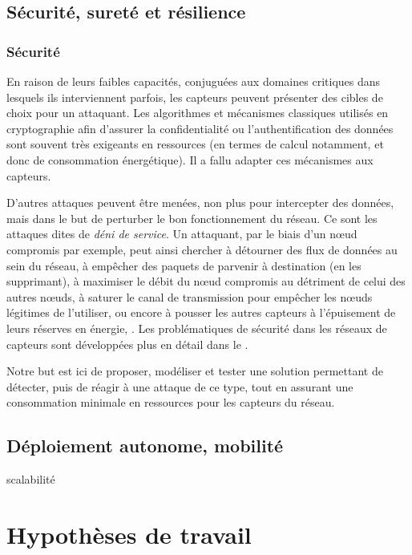     \subsection{Sécurité, sureté et résilience}


        \subsubsection{Sécurité}
En raison de leurs faibles capacités, conjuguées aux domaines critiques dans lesquels ils interviennent parfois, les capteurs peuvent présenter des cibles de choix pour un attaquant.
Les algorithmes et mécanismes classiques utilisés en cryptographie afin d'assurer la confidentialité ou l'authentification des données sont souvent très exigeants en ressources (en termes de calcul notamment, et donc de consommation énergétique).
Il a fallu adapter ces mécanismes aux capteurs.

D'autres attaques peuvent être menées, non plus pour intercepter des données, mais dans le but de perturber le bon fonctionnement du réseau.
Ce sont les attaques dites de \textit{déni de service}.
Un attaquant, par le biais d'un nœud compromis par exemple, peut ainsi chercher à détourner des flux de données au sein du réseau, à empêcher des paquets de parvenir à destination (en les supprimant), à maximiser le débit du nœud compromis au détriment de celui des autres nœuds, à saturer le canal de transmission pour empêcher les nœuds légitimes de l'utiliser, ou encore à pousser les autres capteurs à l'épuisement de leurs réserves en énergie, \etc.
Les problématiques de sécurité dans les réseaux de capteurs sont développées plus en détail dans le .

Notre but est ici de proposer, modéliser et tester une solution permettant de détecter, puis de réagir à une attaque de ce type, tout en assurant une consommation minimale en ressources pour les capteurs du réseau.

    \subsection{Déploiement autonome, mobilité}
    scalabilité

\section{Hypothèses de travail}
